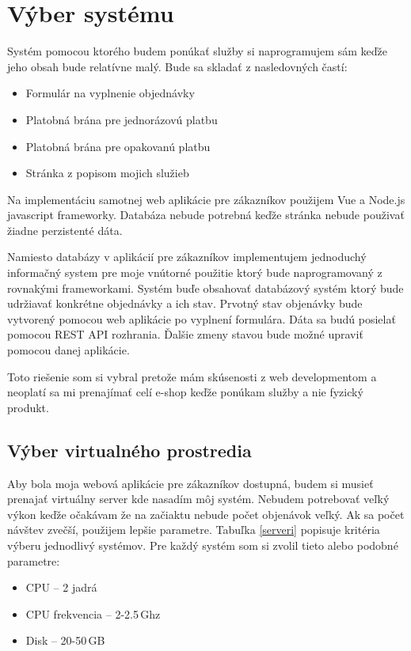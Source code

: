 \chapter{Výber systému}
\label{ch:vyber}
Systém pomocou ktorého budem ponúkať služby si naprogramujem sám keďže jeho obsah bude relatívne malý. Bude sa skladať z nasledovných častí:

\begin{itemize}
  \item Formulár na vyplnenie objednávky
  \item Platobná brána pre jednorázovú platbu
  \item Platobná brána pre opakovanú platbu
  \item Stránka z popisom mojich služieb
\end{itemize}

Na implementáciu samotnej web aplikácie pre zákazníkov použijem Vue \cite{vue} a Node.js \cite{Node} javascript frameworky. Databáza nebude potrebná keďže stránka nebude použivať žiadne perzistenté dáta.

Namiesto databázy v aplikácií pre zákazníkov implementujem jednoduchý informačný system pre moje vnútorné použitie ktorý bude naprogramovaný z rovnakými frameworkami. Systém buďe obsahovať databázový systém ktorý bude udržiavať konkrétne objednávky a ich stav. Prvotný stav objenávky bude vytvorený pomocou web aplikácie po vyplnení formulára. Dáta sa budú posielať pomocou REST API rozhrania. Ďalšie zmeny stavou bude možné upraviť pomocou danej aplikácie. 

Toto riešenie som si vybral pretože mám skúsenosti z web developmentom a neoplatí sa mi prenajímať celí e-shop keďže ponúkam služby a nie fyzický produkt.

\section{Výber virtualného prostredia}
\label{vyber}

Aby bola moja webová aplikácie pre zákazníkov dostupná, budem si musieť prenajať virtuálny server kde nasadím môj systém. Nebudem potrebovať veľký výkon keďže očakávam že na začiaktu nebude počet objenávok veľký. Ak sa počet návštev zvečší, použijem lepšie parametre. Tabuľka \ref{serveri} popisuje kritéria výberu jednodlivý systémov. Pre každý systém som si zvolil tieto alebo podobné parametre:

\begin{itemize}
  \item CPU -- 2 jadrá
  \item CPU frekvencia -- 2-2.5\,Ghz
  \item Disk -- 20-50\,GB
\end{itemize}

